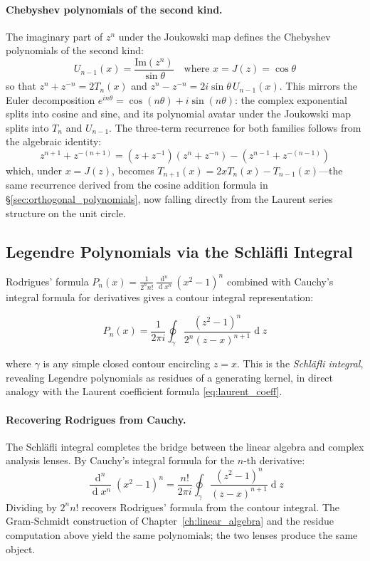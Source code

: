 \documentclass[12pt,a4paper]{report}
\DeclareMathOperator{\deriv}{d}
\theoremstyle{thms}
\theoremstyle{defns}
\begin{document}
\paragraph{Chebyshev polynomials of the second kind.} The imaginary part of $z^n$ under the Joukowski map defines the Chebyshev polynomials of the second kind:
\begin{equation}
    U_{n-1}(x) = \dfrac{\mathrm{Im}(z^n)}{\sin\theta} \quad \text{where } x = J(z) = \cos\theta
\end{equation}
so that $z^n + z^{-n} = 2T_n(x)$ and $z^n - z^{-n} = 2i\sin\theta\,U_{n-1}(x)$. This mirrors the Euler decomposition $e^{in\theta} = \cos(n\theta) + i\sin(n\theta)$: the complex exponential splits into cosine and sine, and its polynomial avatar under the Joukowski map splits into $T_n$ and $U_{n-1}$. The three-term recurrence for both families follows from the algebraic identity:
\begin{equation}
    z^{n+1} + z^{-(n+1)} = (z + z^{-1})(z^n + z^{-n}) - (z^{n-1} + z^{-(n-1)})
\end{equation}
which, under $x = J(z)$, becomes $T_{n+1}(x) = 2xT_n(x) - T_{n-1}(x)$—the same recurrence derived from the cosine addition formula in \S\ref{sec:orthogonal_polynomials}, now falling directly from the Laurent series structure on the unit circle.

\subsection{Legendre Polynomials via the Schl\"{a}fli Integral}

Rodrigues' formula $P_n(x) = \frac{1}{2^n n!}\frac{\deriv^n}{\deriv x^n}(x^2 - 1)^n$ combined with Cauchy's integral formula for derivatives gives a contour integral representation:

\begin{equation}
    P_n(x) = \dfrac{1}{2\pi i}\oint_\gamma \dfrac{(z^2 - 1)^n}{2^n(z - x)^{n+1}}\deriv{z}
    \label{eq:schlafli}
\end{equation}

where $\gamma$ is any simple closed contour encircling $z = x$. This is the \textit{Schl\"{a}fli integral}, revealing Legendre polynomials as residues of a generating kernel, in direct analogy with the Laurent coefficient formula \eqref{eq:laurent_coeff}.

\paragraph{Recovering Rodrigues from Cauchy.} The Schl\"{a}fli integral completes the bridge between the linear algebra and complex analysis lenses. By Cauchy's integral formula for the $n$-th derivative:
\begin{equation}
    \dfrac{\deriv^n}{\deriv x^n}(x^2 - 1)^n = \dfrac{n!}{2\pi i}\oint_\gamma \dfrac{(z^2 - 1)^n}{(z - x)^{n+1}}\deriv{z}
\end{equation}
Dividing by $2^n n!$ recovers Rodrigues' formula from the contour integral. The Gram-Schmidt construction of Chapter~\ref{ch:linear_algebra} and the residue computation above yield the same polynomials; the two lenses produce the same object.
\end{document}
